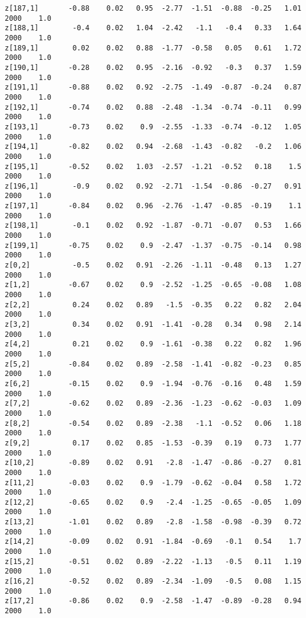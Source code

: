 \documentclass[11pt]{article}
\begin{document}
\begin{Verbatim}[commandchars=\\\{\}]
z[187,1]       -0.88    0.02   0.95  -2.77  -1.51  -0.88  -0.25   1.01   2000    1.0
z[188,1]        -0.4    0.02   1.04  -2.42   -1.1   -0.4   0.33   1.64   2000    1.0
z[189,1]        0.02    0.02   0.88  -1.77  -0.58   0.05   0.61   1.72   2000    1.0
z[190,1]       -0.28    0.02   0.95  -2.16  -0.92   -0.3   0.37   1.59   2000    1.0
z[191,1]       -0.88    0.02   0.92  -2.75  -1.49  -0.87  -0.24   0.87   2000    1.0
z[192,1]       -0.74    0.02   0.88  -2.48  -1.34  -0.74  -0.11   0.99   2000    1.0
z[193,1]       -0.73    0.02    0.9  -2.55  -1.33  -0.74  -0.12   1.05   2000    1.0
z[194,1]       -0.82    0.02   0.94  -2.68  -1.43  -0.82   -0.2   1.06   2000    1.0
z[195,1]       -0.52    0.02   1.03  -2.57  -1.21  -0.52   0.18    1.5   2000    1.0
z[196,1]        -0.9    0.02   0.92  -2.71  -1.54  -0.86  -0.27   0.91   2000    1.0
z[197,1]       -0.84    0.02   0.96  -2.76  -1.47  -0.85  -0.19    1.1   2000    1.0
z[198,1]        -0.1    0.02   0.92  -1.87  -0.71  -0.07   0.53   1.66   2000    1.0
z[199,1]       -0.75    0.02    0.9  -2.47  -1.37  -0.75  -0.14   0.98   2000    1.0
z[0,2]          -0.5    0.02   0.91  -2.26  -1.11  -0.48   0.13   1.27   2000    1.0
z[1,2]         -0.67    0.02    0.9  -2.52  -1.25  -0.65  -0.08   1.08   2000    1.0
z[2,2]          0.24    0.02   0.89   -1.5  -0.35   0.22   0.82   2.04   2000    1.0
z[3,2]          0.34    0.02   0.91  -1.41  -0.28   0.34   0.98   2.14   2000    1.0
z[4,2]          0.21    0.02    0.9  -1.61  -0.38   0.22   0.82   1.96   2000    1.0
z[5,2]         -0.84    0.02   0.89  -2.58  -1.41  -0.82  -0.23   0.85   2000    1.0
z[6,2]         -0.15    0.02    0.9  -1.94  -0.76  -0.16   0.48   1.59   2000    1.0
z[7,2]         -0.62    0.02   0.89  -2.36  -1.23  -0.62  -0.03   1.09   2000    1.0
z[8,2]         -0.54    0.02   0.89  -2.38   -1.1  -0.52   0.06   1.18   2000    1.0
z[9,2]          0.17    0.02   0.85  -1.53  -0.39   0.19   0.73   1.77   2000    1.0
z[10,2]        -0.89    0.02   0.91   -2.8  -1.47  -0.86  -0.27   0.81   2000    1.0
z[11,2]        -0.03    0.02    0.9  -1.79  -0.62  -0.04   0.58   1.72   2000    1.0
z[12,2]        -0.65    0.02    0.9   -2.4  -1.25  -0.65  -0.05   1.09   2000    1.0
z[13,2]        -1.01    0.02   0.89   -2.8  -1.58  -0.98  -0.39   0.72   2000    1.0
z[14,2]        -0.09    0.02   0.91  -1.84  -0.69   -0.1   0.54    1.7   2000    1.0
z[15,2]        -0.51    0.02   0.89  -2.22  -1.13   -0.5   0.11   1.19   2000    1.0
z[16,2]        -0.52    0.02   0.89  -2.34  -1.09   -0.5   0.08   1.15   2000    1.0
z[17,2]        -0.86    0.02    0.9  -2.58  -1.47  -0.89  -0.28   0.94   2000    1.0

\end{Verbatim}
\end{document}
